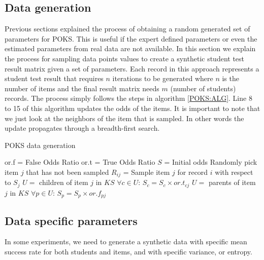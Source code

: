 \subsection{Data generation}

Previous sections explained the process of obtaining a random generated set of parameters for POKS. This is useful if the expert defined parameters or even the estimated parameters from real data are not available. In this section we explain the process for sampling data points values to create a synthetic student test result matrix given a set of parameters. Each record in this approach represents a student test result that requires $n$ iterations to be generated where $n$ is the number of items and the final result matrix needs $m$ (number of students) records. The process simply follows the steps in algorithm \ref{POKS:ALG}. Line 8 to 15 of this algorithm updates the odds of the items. It is important to note that we just look at the neighbors of the item that is sampled. In other words the update propagates through a breadth-first search.


\begin{algorithm}
\caption{POKS data generation}
\label{CHalgorithm}
\begin{algorithmic}[1]
\State or.f = False Odds Ratio
\State or.t = True Odds Ratio
\State  $S$ = Initial odds
\State Randomly pick item $j$ that has not been sampled
\State $R_{ij}$ =  Sample item $j$ for record $i$ with respect to $S_j$
\State $U =$ children of item $j$ in $KS$
\State  $\forall c\in U$:  $S_c = S_c\times or.t_{cj}$
\EndIf
{}
\State $U =$ parents of item $j$ in $KS$
\State  $\forall p\in U$:  $S_p = S_p\times or.f_{pj}$
\EndIf
\EndFor
\EndFor
\end{algorithmic}
\label{POKS:ALG}
\end{algorithm}



\subsection{Data specific parameters}

In some experiments, we need to generate a synthetic data with specific mean success rate for both students and items, and with specific variance, or entropy.

